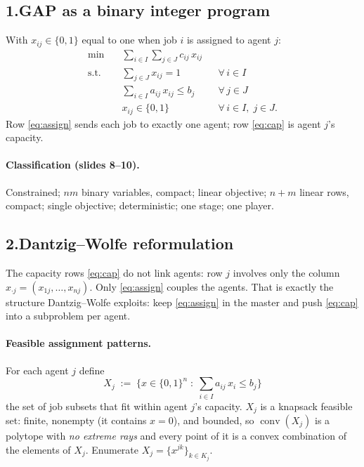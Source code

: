 \documentclass[11pt]{article}
\DeclareMathOperator*{\minimize}{min}
\DeclareMathOperator{\conv}{conv}
\theoremstyle{definition}
\theoremstyle{plain}
\begin{document}
\subsection*{1.\quad GAP as a binary integer program}

With $x_{ij} \in \{0,1\}$ equal to one when job $i$ is assigned to agent
$j$:
\begin{align}
  \minimize \quad & \sum_{i \in I} \sum_{j \in J} c_{ij}\, x_{ij}
    \label{eq:gapobj}\\
  \text{s.t.} \quad
    & \sum_{j \in J} x_{ij} = 1 && \forall\, i \in I
      \label{eq:assign}\\
    & \sum_{i \in I} a_{ij}\, x_{ij} \le b_j && \forall\, j \in J
      \label{eq:cap}\\
    & x_{ij} \in \{0,1\} && \forall\, i \in I,\; j \in J .
\end{align}
Row \eqref{eq:assign} sends each job to exactly one agent; row
\eqref{eq:cap} is agent $j$'s capacity.

\paragraph{Classification (slides 8--10).} Constrained; $nm$ binary
variables, compact; linear objective; $n + m$ linear rows, compact;
single objective; deterministic; one stage; one player.

\subsection*{2.\quad Dantzig--Wolfe reformulation}

The capacity rows \eqref{eq:cap} do not link agents: row $j$ involves
only the column $x_{\cdot j} = (x_{1j}, \dots, x_{nj})$. Only
\eqref{eq:assign} couples the agents. That is exactly the structure
Dantzig--Wolfe exploits: keep \eqref{eq:assign} in the master and push
\eqref{eq:cap} into a subproblem per agent.

\paragraph{Feasible assignment patterns.} For each agent $j$ define
\[
  \boxed{\;
  X_j \;:=\; \Big\{ x \in \{0,1\}^{n} \;:\;
    \sum_{i \in I} a_{ij}\, x_i \le b_j \Big\} \;}
\]
the set of job subsets that fit within agent $j$'s capacity. $X_j$ is a
knapsack feasible set: finite, nonempty (it contains $x = 0$), and
bounded, so $\conv(X_j)$ is a polytope with \emph{no extreme rays} and
every point of it is a convex combination of the elements of $X_j$.
Enumerate $X_j = \{x^{jk}\}_{k \in K_j}$.
\end{document}
